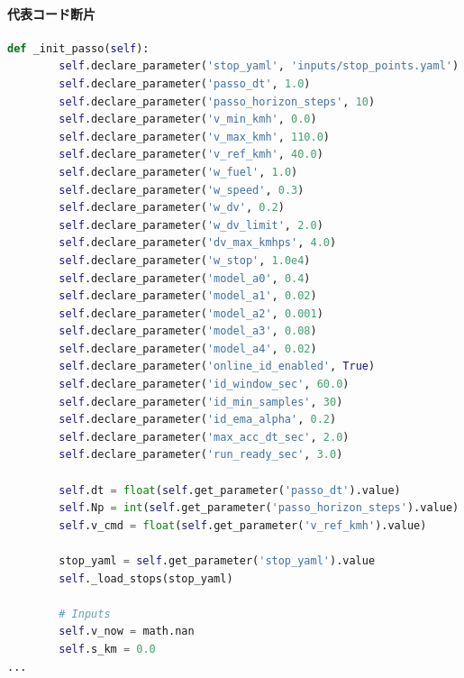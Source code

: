 \documentclass[a4paper,11pt]{article}
\begin{document}
            \paragraph{代表コード断片}
            \begin{lstlisting}[language=Python]
    def _init_passo(self):
        self.declare_parameter('stop_yaml', 'inputs/stop_points.yaml')
        self.declare_parameter('passo_dt', 1.0)
        self.declare_parameter('passo_horizon_steps', 10)
        self.declare_parameter('v_min_kmh', 0.0)
        self.declare_parameter('v_max_kmh', 110.0)
        self.declare_parameter('v_ref_kmh', 40.0)
        self.declare_parameter('w_fuel', 1.0)
        self.declare_parameter('w_speed', 0.3)
        self.declare_parameter('w_dv', 0.2)
        self.declare_parameter('w_dv_limit', 2.0)
        self.declare_parameter('dv_max_kmhps', 4.0)
        self.declare_parameter('w_stop', 1.0e4)
        self.declare_parameter('model_a0', 0.4)
        self.declare_parameter('model_a1', 0.02)
        self.declare_parameter('model_a2', 0.001)
        self.declare_parameter('model_a3', 0.08)
        self.declare_parameter('model_a4', 0.02)
        self.declare_parameter('online_id_enabled', True)
        self.declare_parameter('id_window_sec', 60.0)
        self.declare_parameter('id_min_samples', 30)
        self.declare_parameter('id_ema_alpha', 0.2)
        self.declare_parameter('max_acc_dt_sec', 2.0)
        self.declare_parameter('run_ready_sec', 3.0)

        self.dt = float(self.get_parameter('passo_dt').value)
        self.Np = int(self.get_parameter('passo_horizon_steps').value)
        self.v_cmd = float(self.get_parameter('v_ref_kmh').value)

        stop_yaml = self.get_parameter('stop_yaml').value
        self._load_stops(stop_yaml)

        # Inputs
        self.v_now = math.nan
        self.s_km = 0.0
...
\end{lstlisting}
\end{document}
